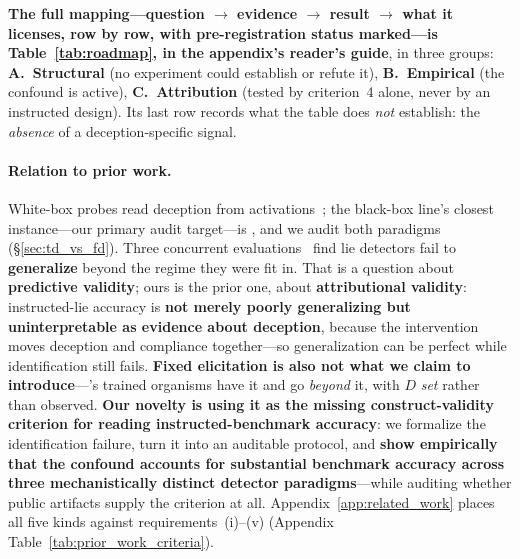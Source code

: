 \noindent \textbf{The full mapping---question $\to$ evidence $\to$ result $\to$ what it licenses, row by row, with pre-registration status marked---is Table~\ref{tab:roadmap}, in the appendix's reader's guide}, in three groups: \textbf{A.~Structural} (no experiment could establish or refute it), \textbf{B.~Empirical} (the confound is active), \textbf{C.~Attribution} (tested by criterion~4 alone, never by an instructed design). Its last row records what the table does \emph{not} establish: the \emph{absence} of a deception-specific signal.

\paragraph{Relation to prior work.} White-box probes read deception from activations~\citep{zou2023representation, burns2022discovering, azaria2023internal}; the black-box line's closest instance---our primary audit target---is \citet{pacchiardi2024catch}, and we audit both paradigms (§\ref{sec:td_vs_fd}). Three concurrent evaluations~\citep{kretschmar2025liarsbench, cooney2026didyoulie, hopkins2026liedetectors} find lie detectors fail to \textbf{generalize} beyond the regime they were fit in. That is a question about \textbf{predictive validity}; ours is the prior one, about \textbf{attributional validity}: instructed-lie accuracy is \textbf{not merely poorly generalizing but uninterpretable as evidence about deception}, because the intervention moves deception and compliance together---so generalization can be perfect while identification still fails. \textbf{Fixed elicitation is also not what we claim to introduce}---\citet{cooney2026didyoulie}'s trained organisms have it and go \emph{beyond} it, with $D$ \emph{set} rather than observed. \textbf{Our novelty is using it as the missing construct-validity criterion for reading instructed-benchmark accuracy}: we formalize the identification failure, turn it into an auditable protocol, and \textbf{show empirically that the confound accounts for substantial benchmark accuracy across three mechanistically distinct detector paradigms}---while auditing whether public artifacts supply the criterion at all. Appendix~\ref{app:related_work} places all five kinds against requirements~(i)--(v) (Appendix Table~\ref{tab:prior_work_criteria}).

